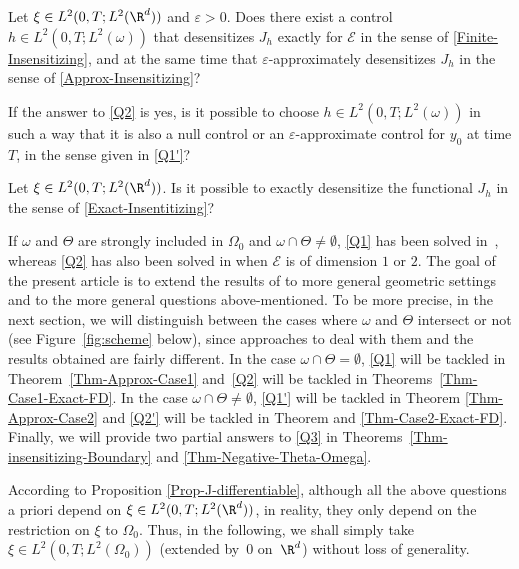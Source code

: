 \label{Q2}
Let {$\xi \in L^2(0,T; L^2(\R^d))$} and $\varepsilon>0$. Does there exist a control $h\in L^2(0,T; L^2(\omega))$ that desensitizes $J_h$ exactly for $\mathcal{E}$ in the sense of \eqref{Finite-Insensitizing}, and at the same time that $\varepsilon$-approximately desensitizes $J_h$ in the sense of \eqref{Approx-Insensitizing}?

\label{Q2'}
If the answer to \ref{Q2} is yes, is it possible to choose $h \in L^2(0,T; L^2(\omega))$ in such a way that it is also a null control or an $\varepsilon$-approximate control for $y_0$ at time $T$, in the sense given in \ref{Q1'}?

\label{Q3}
Let {$\xi \in L^2(0,T; L^2(\R^d))$}. Is it possible to exactly desensitize the functional $J_h$ in the sense of \eqref{Exact-Insentitizing}?

If $\omega$ and $\Theta$ are strongly included in $\Omega_0$ and $\omega\cap \Theta \not = \emptyset$, \ref{Q1} has been solved in~\cite{Lissy-Privat-Simpore}, whereas \ref{Q2} has also been solved in \cite{Lissy-Privat-Simpore} when $\mathcal{E}$ is of dimension $1$ or $2$. The goal of the present article is to extend the results of \cite{Lissy-Privat-Simpore} to more general geometric settings and to the more general questions above-mentioned.
To be more precise, in the next section, we will distinguish between the cases where $\omega$ and $\Theta$ intersect or not (see Figure~\ref{fig:scheme} below), since approaches to deal with them and the results obtained are fairly different. In the case $\omega \cap \Theta = \emptyset$, \ref{Q1} will be tackled in Theorem~\ref{Thm-Approx-Case1} and~\ref{Q2} will be tackled in Theorems~\ref{Thm-Case1-Exact-FD}. In the case $\omega \cap \Theta \not = \emptyset$, \ref{Q1'} will be tackled in Theorem \ref{Thm-Approx-Case2} and \ref{Q2'} will be tackled in Theorem and \ref{Thm-Case2-Exact-FD}. Finally, we will provide two partial answers to \ref{Q3} in Theorems~\ref{Thm-insensitizing-Boundary} and \ref{Thm-Negative-Theta-Omega}.

\begin{remark}
{According to Proposition \ref{Prop-J-differentiable}, although all the above questions a priori depend on $\xi \in L^2(0,T; L^2(\R^d))$, in reality, they only depend on the restriction on $\xi$ to $\Omega_0$. Thus, in the following, we shall simply take $\xi \in L^2(0,T; L^2(\Omega_0))$ (extended by~$0$ on~$\R^d$) without loss of generality.}
\end{remark}

